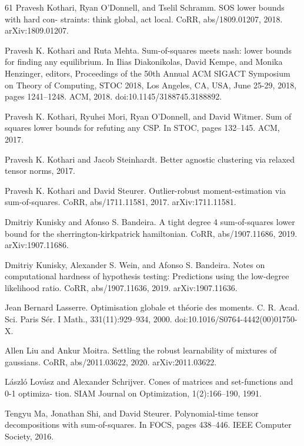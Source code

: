 \documentclass[10pt,a4paper]{article}
\theoremstyle{definition}
\begin{document}
\begin{thebibliography}{61}
Pravesh Kothari, Ryan O’Donnell, and Tselil Schramm. SOS lower bounds with hard con- straints: think global, act local. CoRR, abs/1809.01207, 2018. arXiv:1809.01207.

Pravesh K. Kothari and Ruta Mehta. Sum-of-squares meets nash: lower bounds for finding any equilibrium. In Ilias Diakonikolas, David Kempe, and Monika Henzinger, editors, Proceedings of the 50th Annual ACM SIGACT Symposium on Theory of Computing, STOC 2018, Los Angeles, CA, USA, June 25-29, 2018, pages 1241–1248. ACM, 2018. doi:10.1145/3188745.3188892.

Pravesh K. Kothari, Ryuhei Mori, Ryan O’Donnell, and David Witmer. Sum of squares lower bounds for refuting any CSP. In STOC, pages 132–145. ACM, 2017.

Pravesh K. Kothari and Jacob Steinhardt. Better agnostic clustering via relaxed tensor norms, 2017.

Pravesh K. Kothari and David Steurer. Outlier-robust moment-estimation via sum-of-squares. CoRR, abs/1711.11581, 2017. arXiv:1711.11581.

Dmitriy Kunisky and Afonso S. Bandeira. A tight degree 4 sum-of-squares lower bound for the sherrington-kirkpatrick hamiltonian. CoRR, abs/1907.11686, 2019. arXiv:1907.11686.

Dmitriy Kunisky, Alexander S. Wein, and Afonso S. Bandeira. Notes on computational hardness of hypothesis testing: Predictions using the low-degree likelihood ratio. CoRR, abs/1907.11636, 2019. arXiv:1907.11636.

Jean Bernard Lasserre. Optimisation globale et théorie des moments. C. R. Acad. Sci. Paris Sér. I Math., 331(11):929–934, 2000. doi:10.1016/S0764-4442(00)01750-X.

Allen Liu and Ankur Moitra. Settling the robust learnability of mixtures of gaussians. CoRR, abs/2011.03622, 2020. arXiv:2011.03622.

László Lovász and Alexander Schrijver. Cones of matrices and set-functions and 0-1 optimiza- tion. SIAM Journal on Optimization, 1(2):166–190, 1991.

Tengyu Ma, Jonathan Shi, and David Steurer. Polynomial-time tensor decompositions with sum-of-squares. In FOCS, pages 438–446. IEEE Computer Society, 2016.


\end{thebibliography}
\end{document}
